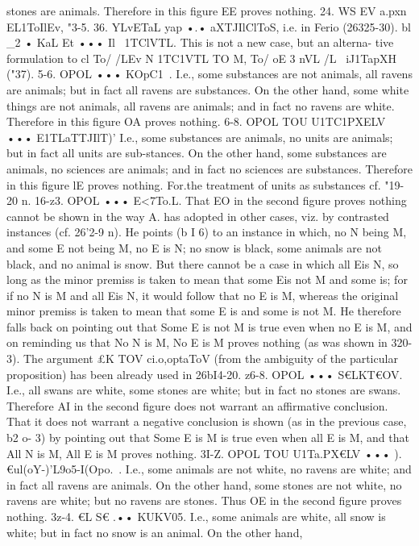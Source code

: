 {stones are animals. Therefore in this figure EE proves nothing.
24.
WS EV a.pxn EL1ToIlEv, "3-5.
36. YLvETaL yap •.• aXTJIlClToS, i.e. in Ferio (26325-30).
bl _2 • KaL Et ••• Il~ 1TClVTL. This is not a new case, but an alterna-
tive formulation to cl To/ /LEv N 1TC1VTL TO M, To/ oE 3 nVL /L~ iJ1TapXH
("37).
5-6. OPOL ••• KOpC1~. I.e., some substances are not animals,
all ravens are animals; but in fact all ravens are substances.
On the other hand, some white things are not animals, all ravens
are animals; and in fact no ravens are white. Therefore in this
figure OA proves nothing.
6-8. OPOL TOU U1TC1PXELV ••• E1TLaTTJIlT)' I.e., some substances
are animals, no units are animals; but in fact all units are sub-stances. On the other hand, some substances are animals, no
sciences are animals; and in fact no sciences are substances.
Therefore in this figure lE proves nothing.
For.the treatment of units as substances cf. "19-20 n.
16-z3. OPOL ••• E<7To.L. That EO in the second figure proves
nothing cannot be shown in the way A. has adopted in other
cases, viz. by contrasted instances (cf. 26'2-9 n). He points
(b I 6) to an instance in which, no N being M, and some E not being
M, no E is N; no snow is black, some animals are not black, and
no animal is snow. But there cannot be a case in which all Eis
N, so long as the minor premiss is taken to mean that some Eis
not M and some is; for if no N is M and all Eis N, it would follow
that no E is M, whereas the original minor premiss is taken to
mean that some E is and some is not M. He therefore falls back
on pointing out that Some E is not M is true even when no E
is M, and on reminding us that No N is M, No E is M proves
nothing (as was shown in 320-3). The argument £K TOV ci.o,optaToV
(from the ambiguity of the particular proposition) has been
already used in 26bI4-20.
z6-8. OPOL ••• S€LKT€OV. I.e., all swans are white, some stones
are white; but in fact no stones are swans. Therefore AI in
the second figure does not warrant an affirmative conclusion.
That it does not warrant a negative conclusion is shown (as in
the previous case, b2 o- 3) by pointing out that Some E is M is true
even when all E is M, and that All N is M, All E is M proves
nothing.
3I-Z. OPOL TOU U1Ta.PX€LV ••• ).€ul(oY-)'L9o5-I(Opo.~. I.e., some
animals are not white, no ravens are white; and in fact all ravens
are animals. On the other hand, some stones are not white, no
ravens are white; but no ravens are stones. Thus OE in the
second figure proves nothing.
3z-4. €L S€ .•• KUKV05. I.e., some animals are white, all snow
is white; but in fact no snow is an animal. On the other hand,
}
